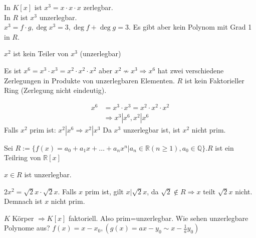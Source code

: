 \documentclass{article}
\newcommand{\R}{\mathbb{R}}
\newcommand{\Q}{\mathbb{Q}}
\begin{document}
\begin{enumerate}[1.]
        In $K[x]$ ist $x^3=x\cdot x\cdot x$ zerlegbar.\\
        In $R$ ist $x^3$ unzerlegbar.\\
        $x^3=f\cdot g,\deg x^3=3,\deg f+\deg g=3$.
        Es gibt aber kein Polynom mit Grad 1 in $R$.

        $x^2$ ist kein Teiler von $x^3$ (unzerlegbar)

        Es ist $x^6=x^3\cdot x^3=x^2\cdot x^2\cdot x^2$
        aber $x^2\nsim x^3\Rightarrow x^6$ hat zwei
        verschiedene Zerlegungen in Produkte von
        unzerlegbaren Elementen. $R$ ist kein Faktorieller
        Ring (Zerlegung nicht eindeutig).

        \begin{align*}
            x^6&=x^3\cdot x^3=x^2\cdot x^2\cdot x^2\\
            &\Rightarrow x^3|x^6, x^2|x^6
        \end{align*}
        Falls $x^2$ prim ist: $x^2|x^6\Rightarrow x^2|x^3$
        Da $x^3$ unzerlegbar ist, ist $x^2$ nicht prim.

        Sei $R:=\{f(x)=a_0+a_1x+\hdots+a_nx^n|a_n
        \in\R(n\geq 1),a_0\in\Q\}.R$ ist ein Teilring
        von $\R[x]$

        $x\in R$ ist unzerlegbar.

        $2x^2=\sqrt{2}x\cdot\sqrt{2}x$. Falls $x$ prim ist,
        gilt $x|\sqrt{2}x$, da $\sqrt{2}\notin R\Rightarrow
        x$ teilt $\sqrt{2}x$ nicht. Demnach ist $x$
        nicht prim.

        $K$ Körper $\Rightarrow K[x]$ faktoriell.
        Also prim=unzerlegbar.
        Wie sehen unzerlegbare Polynome aus?
        $f(x)=x-x_0,\left(g(x)=ax-y_0\sim x-\frac{1}{a}
        y_0\right)$
\end{enumerate}
\end{document}
